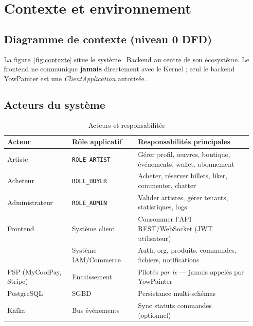 \chapter{Contexte et environnement}

\section{Diagramme de contexte (niveau 0 DFD)}

La figure~\ref{fig:contexte} situe le système \yow\ Backend au centre de son écosystème.
Le frontend ne communique \textbf{jamais} directement avec le Kernel ; seul le backend
YowPainter est une \emph{ClientApplication} autorisée.


\section{Acteurs du système}

\begin{table}[h]
  \centering
  \caption{Acteurs et responsabilités}
  \label{tab:acteurs}
  \begin{tabular}{@{}p{3cm}p{4cm}p{7cm}@{}}
    \toprule
    \textbf{Acteur} & \textbf{Rôle applicatif} & \textbf{Responsabilités principales} \\
    \midrule
    Artiste & \texttt{ROLE\_ARTIST} & Gérer profil, œuvres, boutique, événements, wallet, abonnement \\
    Acheteur & \texttt{ROLE\_BUYER} & Acheter, réserver billets, liker, commenter, chatter \\
    Administrateur & \texttt{ROLE\_ADMIN} & Valider artistes, gérer tenants, statistiques, logs \\
    Frontend & Système client & Consommer l'API REST/WebSocket (JWT utilisateur) \\
     & Système IAM/Commerce & Auth, org, produits, commandes, fichiers, notifications \\
    PSP (MyCoolPay, Stripe) & Encaissement & Pilotés \emph{par le } — jamais appelés par YowPainter \\
    PostgreSQL & SGBD & Persistance multi-schémas \\
    Kafka & Bus événements & Sync statuts commandes (optionnel) \\
    \bottomrule
  \end{tabular}
\end{table}

